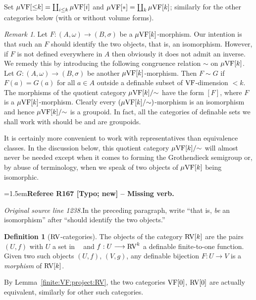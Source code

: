 \documentclass[12pt]{amsart}
\newcommand{\RefereeRemark}[4]{%
  \par\medskip\begingroup\normalfont\small\color{RefereePurple}%
  \emergencystretch=1.5em\noindent\textbf{Referee R#1 [#2] -- #3.}\par\nobreak\noindent #4\par
  \endgroup\medskip
}
\newcommand{\memph}[1]{{\color{magenta}\emph{#1}}}
\theoremstyle{plain}
\theoremstyle{definition}
\newtheorem{defn}[thm]{Definition}
\theoremstyle{remark}
\newtheorem{rem}[thm]{Remark}
\numberwithin{equation}{section}
\theoremstyle{plain}
\newcommand{\VF}{\textup{VF}}
\newcommand{\RV}{\textup{RV}}
\newcommand{\0}{\emptyset}
\newcommand{\fun}{\longrightarrow}
\newcommand{\mVF}{{\mu}{\VF}}
\newcommand{\mgVF}{{\mu} {\VF}}
\DeclareMathOperator{\RVV}{RV_\infty}
\begin{document}
Set $\mgVF[{\leq} k] = \coprod_{i \leq k} \mgVF[i]$ and $\mgVF[*] = \coprod_{k} \mVF[k]$; similarly for the other categories below (with or without volume forms).


\begin{rem}\label{mor:equi}
Let $F : (A, \omega) \fun (B, \sigma)$ be a $\mgVF[k]$-morphism. Our intention is that such an $F$ should identify the two objects, that is, an isomorphism. However, if $F$ is not defined everywhere in $A$ then obviously it does not admit an inverse. We remedy this by introducing the following congruence relation $\sim$ on $\mgVF[k]$. Let $G : (A, \omega) \fun (B, \sigma)$ be another $\mgVF[k]$-morphism. Then $F \sim G$ if $F(a) = G(a)$ for all $a \in A$  outside a definable subset  of $\VF$-dimension $< k$. The morphisms of the quotient category $\mgVF[k] /{\sim}$ have the form $[F]$, where $F$ is a $\mgVF[k]$-morphism. Clearly every $(\mgVF[k] / {\sim})$-morphism is an isomorphism and hence $\mgVF[k] / {\sim}$ is a groupoid. In fact, all the categories of definable sets we shall work with should be and are groupoids.

It is certainly more convenient to work with representatives than equivalence classes. In the discussion below, this quotient category $\mgVF[k] /{\sim}$ will almost never be needed except when it comes to forming the Grothendieck semigroup or, by abuse of terminology, when we speak of two objects of $\mgVF[k]$ being isomorphic.

\RefereeRemark{167}{Typo; new}{Missing verb}{%
\textit{Original source line 1238.}\quad In the preceding paragraph, write ``that is, \emph{be} an isomorphism'' after ``should identify the two objects.''
}
\end{rem}



\begin{defn}[$\RV$-categories]\label{defn:c:RV:cat}
The objects of the category $\RV[k]$ are the pairs $(U, f)$ with $U$ a set in $\RVV$ and $f : U \fun \RV^k$ a definable finite-to-one function. Given two such objects $(U, f)$, $(V, g)$, any definable bijection $F : U \fun V$ is a \memph{morphism} of $\RV[k]$.
\end{defn}

By Lemma~\ref{finite:VF:project:RV}, the two categories $\VF[0]$, $\RV[0]$ are actually equivalent, similarly for other such categories.
\end{document}

